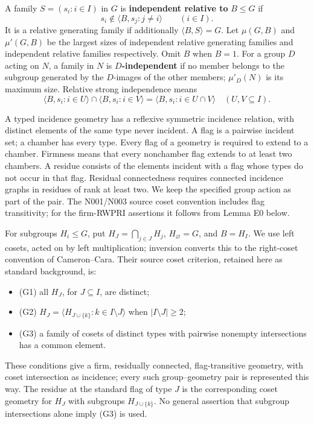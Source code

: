\documentclass[
  10pt,
  letterpaper,
]{article}
\newcounter{none} %
\providecommand{\tightlist}{%
  \setlength{\itemsep}{0pt}\setlength{\parskip}{0pt}}
\begin{document}
A family \(S=(s_i:i\in I)\) in \(G\) is \textbf{independent relative to}
\(B\leq G\) if \[
s_i\notin\langle B,s_j:j\ne i\rangle\qquad(i\in I).
\] It is a relative generating family if additionally
\(\langle B,S\rangle=G\). Let \(\mu(G,B)\) and \(\mu'(G,B)\) be the
largest sizes of independent relative generating families and
independent relative families respectively. Omit \(B\) when \(B=1\). For
a group \(D\) acting on \(N\), a family in \(N\) is
\textbf{\(D\)-independent} if no member belongs to the subgroup
generated by the \(D\)-images of the other members; \(\mu'_D(N)\) is its
maximum size. Relative strong independence means \[
\langle B,s_i:i\in U\rangle\cap\langle B,s_i:i\in V\rangle
 =\langle B,s_i:i\in U\cap V\rangle \quad(U,V\subseteq I).
\tag{A1.1}
\]

A typed incidence geometry has a reflexive symmetric incidence relation,
with distinct elements of the same type never incident. A flag is a
pairwise incident set; a chamber has every type. Every flag of a
geometry is required to extend to a chamber. Firmness means that every
nonchamber flag extends to at least two chambers. A residue consists of
the elements incident with a flag whose types do not occur in that flag.
Residual connectedness requires connected incidence graphs in residues
of rank at least two. We keep the specified group action as part of the
pair. The N001/N003 source coset convention includes flag transitivity;
for the firm-RWPRI assertions it follows from Lemma E0 below.

For subgroups \(H_i\leq G\), put \(H_J=\bigcap_{j\in J}H_j\),
\(H_\varnothing=G\), and \(B=H_I\). We use left cosets, acted on by left
multiplication; inversion converts this to the right-coset convention of
Cameron--Cara. Their source coset criterion, retained here as standard
background, is:

\begin{itemize}
\tightlist
\item
  (G1) all \(H_J\), for \(J\subseteq I\), are distinct;
\item
  (G2) \(H_J=\langle H_{J\cup\{k\}}:k\in I\setminus J\rangle\) when
  \(|I\setminus J|\geq2\);
\item
  (G3) a family of cosets of distinct types with pairwise nonempty
  intersections has a common element.
\end{itemize}

These conditions give a firm, residually connected, flag-transitive
geometry, with coset intersection as incidence; every such
group--geometry pair is represented this way. The residue at the
standard flag of type \(J\) is the corresponding coset geometry for
\(H_J\) with subgroups \(H_{J\cup\{k\}}\). No general assertion that
subgroup intersections alone imply (G3) is used.
\end{document}
